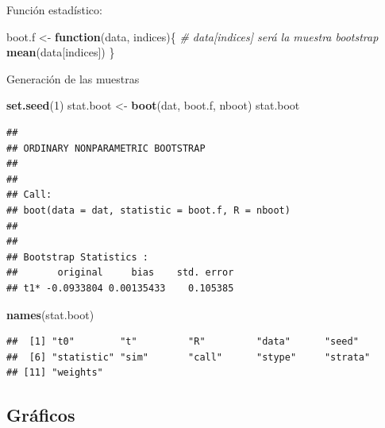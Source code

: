 \documentclass[]{book}
\newenvironment{Shaded}{\begin{snugshade}}{\end{snugshade}}
\newcommand{\KeywordTok}[1]{\textcolor[rgb]{0.13,0.29,0.53}{\textbf{#1}}}
\newcommand{\DataTypeTok}[1]{\textcolor[rgb]{0.13,0.29,0.53}{#1}}
\newcommand{\DecValTok}[1]{\textcolor[rgb]{0.00,0.00,0.81}{#1}}
\newcommand{\StringTok}[1]{\textcolor[rgb]{0.31,0.60,0.02}{#1}}
\newcommand{\CommentTok}[1]{\textcolor[rgb]{0.56,0.35,0.01}{\textit{#1}}}
\newcommand{\OtherTok}[1]{\textcolor[rgb]{0.56,0.35,0.01}{#1}}
\newcommand{\ControlFlowTok}[1]{\textcolor[rgb]{0.13,0.29,0.53}{\textbf{#1}}}
\newcommand{\OperatorTok}[1]{\textcolor[rgb]{0.81,0.36,0.00}{\textbf{#1}}}
\newcommand{\NormalTok}[1]{#1}
\theoremstyle{definition}
\theoremstyle{definition}
\theoremstyle{definition}
\theoremstyle{remark}
\begin{document}
Función estadístico:

\begin{Shaded}
\begin{Highlighting}[]
\NormalTok{boot.f <-}\StringTok{ }\ControlFlowTok{function}\NormalTok{(data, indices)\{}
  \CommentTok{# data[indices] será la muestra bootstrap}
  \KeywordTok{mean}\NormalTok{(data[indices])}
\NormalTok{\}}
\end{Highlighting}
\end{Shaded}

Generación de las muestras

\begin{Shaded}
\begin{Highlighting}[]
\KeywordTok{set.seed}\NormalTok{(}\DecValTok{1}\NormalTok{)}
\NormalTok{stat.boot <-}\StringTok{ }\KeywordTok{boot}\NormalTok{(dat, boot.f, nboot)}
\NormalTok{stat.boot}
\end{Highlighting}
\end{Shaded}

\begin{verbatim}
## 
## ORDINARY NONPARAMETRIC BOOTSTRAP
## 
## 
## Call:
## boot(data = dat, statistic = boot.f, R = nboot)
## 
## 
## Bootstrap Statistics :
##       original     bias    std. error
## t1* -0.0933804 0.00135433    0.105385
\end{verbatim}

\begin{Shaded}
\begin{Highlighting}[]
\KeywordTok{names}\NormalTok{(stat.boot)}
\end{Highlighting}
\end{Shaded}

\begin{verbatim}
##  [1] "t0"        "t"         "R"         "data"      "seed"     
##  [6] "statistic" "sim"       "call"      "stype"     "strata"   
## [11] "weights"
\end{verbatim}

\subsection{Gráficos}\label{graficos}

\begin{Shaded}
\end{Shaded}
\end{document}
